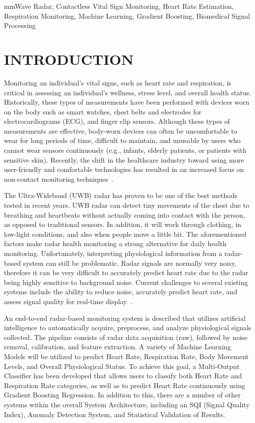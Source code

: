 \documentclass[conference]{IEEEtran}
\begin{document}
\begin{IEEEkeywords}
mmWave Radar, Contactless Vital Sign Monitoring, Heart Rate Estimation, Respiration Monitoring, Machine Learning, Gradient Boosting, Biomedical Signal Processing
\end{IEEEkeywords}

\section{INTRODUCTION}

Monitoring an individual's vital signs, such as heart rate and respiration, is critical in assessing an individual's wellness, stress level, and overall health status. Historically, these types of measurements have been performed with devices worn on the body such as smart watches, chest belts and electrodes for electrocardiograms (ECG), and finger clip sensors. Although these types of measurements are effective, body-worn devices can often be uncomfortable to wear for long periods of time, difficult to maintain, and unusable by users who cannot wear sensors continuously (e.g., infants, elderly patients, or patients with sensitive skin). Recently, the shift in the healthcare industry toward using more user-friendly and comfortable technologies has resulted in an increased focus on non-contact monitoring techniques~\cite{ref1,ref2,ref3}.

The Ultra-Wideband (UWB) radar has proven to be one of the best methods tested in recent years. UWB radar can detect tiny movements of the chest due to breathing and heartbeats without actually coming into contact with the person, as opposed to traditional sensors. In addition, it will work through clothing, in low-light conditions, and also when people move a little bit. The aforementioned factors make radar health monitoring a strong alternative for daily health monitoring. Unfortunately, interpreting physiological information from a radar-based system can still be problematic. Radar signals are normally very noisy, therefore it can be very difficult to accurately predict heart rate due to the radar being highly sensitive to background noise. Current challenges to several existing systems include the ability to reduce noise, accurately predict heart rate, and assess signal quality for real-time display~\cite{ref4,ref5,ref6}.

An end-to-end radar-based monitoring system is described that utilizes artificial intelligence to automatically acquire, preprocess, and analyze physiological signals collected. The pipeline consists of radar data acquisition (raw), followed by noise removal, calibration, and feature extraction. A variety of Machine Learning Models will be utilized to predict Heart Rate, Respiration Rate, Body Movement Levels, and Overall Physiological Status. To achieve this goal, a Multi-Output Classifier has been developed that allows users to classify both Heart Rate and Respiration Rate categories, as well as to predict Heart Rate continuously using Gradient Boosting Regression. In addition to this, there are a number of other systems within the overall System Architecture, including an SQI (Signal Quality Index), Anomaly Detection System, and Statistical Validation of Results.
\end{document}
